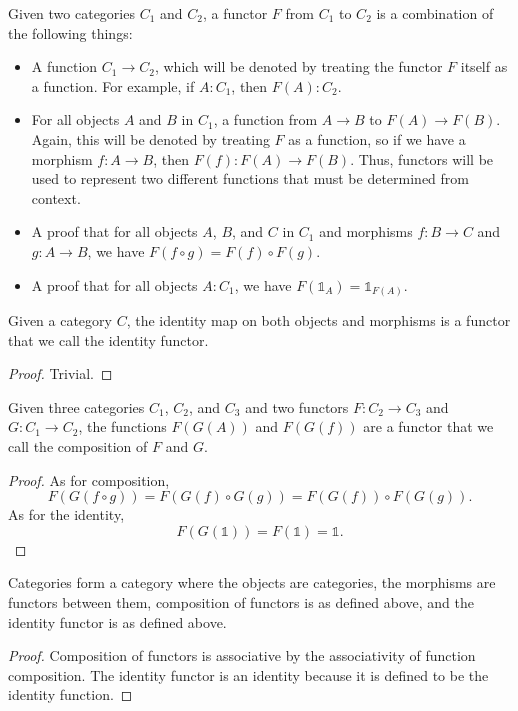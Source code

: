 \documentclass[../math.tex]{subfiles}
\begin{document}
\begin{definition}
    Given two categories $C_1$ and $C_2$, a functor $F$ from $C_1$ to $C_2$ is a
    combination of the following things:
    \begin{itemize}
        \item A function $C_1 \to C_2$, which will be denoted by treating the
            functor $F$ itself as a function.  For example, if $A : C_1$, then
            $F(A) : C_2$.
        \item For all objects $A$ and $B$ in $C_1$, a function from $A \to B$ to
            $F(A) \to F(B)$.  Again, this will be denoted by treating $F$ as a
            function, so if we have a morphism $f : A \to B$, then $F(f) : F(A)
            \to F(B)$.  Thus, functors will be used to represent two different
            functions that must be determined from context.
        \item A proof that for all objects $A$, $B$, and $C$ in $C_1$ and
            morphisms $f : B \to C$ and $g : A \to B$, we have $F(f \circ g) =
            F(f) \circ F(g)$.
        \item A proof that for all objects $A : C_1$, we have $F(\mathds 1_A) =
            \mathds 1_{F(A)}$.
    \end{itemize}
\end{definition}

\begin{theorem}
    Given a category $C$, the identity map on both objects and morphisms is a
    functor that we call the identity functor.
\end{theorem}
\begin{proof}
    Trivial.
\end{proof}

\begin{theorem}
    Given three categories $C_1$, $C_2$, and $C_3$ and two functors $F : C_2 \to
    C_3$ and $G : C_1 \to C_2$, the functions $F(G(A))$ and $F(G(f))$ are a
    functor that we call the composition of $F$ and $G$.
\end{theorem}
\begin{proof}
    As for composition,
    \[
        F(G(f \circ g)) = F(G(f) \circ G(g)) = F(G(f)) \circ F(G(g)).
    \]
    As for the identity,
    \[
        F(G(\mathds 1)) = F(\mathds 1) = \mathds 1.
    \]
\end{proof}

\begin{theorem}
    Categories form a category \Cat where the objects are categories, the
    morphisms are functors between them, composition of functors is as defined
    above, and the identity functor is as defined above.
\end{theorem}
\begin{proof}
    Composition of functors is associative by the associativity of function
    composition.  The identity functor is an identity because it is defined to
    be the identity function.
\end{proof}
\end{document}

